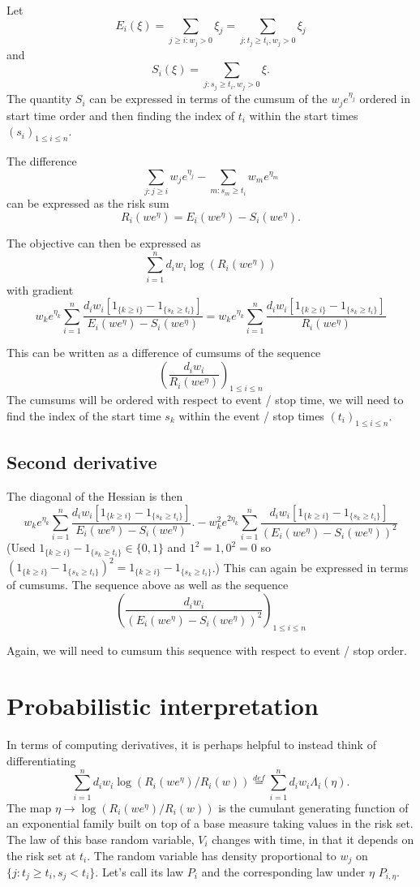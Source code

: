 \documentclass{article}
\begin{document}
Let 
$$
E_i(\xi) = \sum_{j \geq i: w_j > 0} \xi_j = \sum_{j: t_j \geq t_i, w_j > 0} \xi_j
$$
and
$$
S_i(\xi) = \sum_{j: s_j \geq t_i, w_j > 0} \xi.
$$
The quantity $S_i$ can be expressed in terms of the cumsum
of the $w_j e^{\eta_j}$ ordered in start time order and then finding the index
 of $t_i$ within the start times $(s_i)_{1 \leq i \leq n}$.
 
The difference
$$
\sum_{j: j \geq i} w_j e^{\eta_j} - \sum_{m:s_m \geq t_i} w_m e^{\eta_m}
$$
can be expressed as the risk sum
$$
R_i(we^{\eta}) = E_i(we^{\eta}) - S_i(we^{\eta}).$$


The objective can then be expressed as
$$
\sum_{i=1}^n d_i w_i \log(R_i(we^{\eta}))$$
with gradient
$$
w_k e^{\eta_k}
\sum_{i=1}^n 
\frac{d_i w_i [1_{\{k \geq i\}} - 1_{\{s_k \geq t_i\}}]}{E_i(we^{\eta})-S_i(we^{\eta})} = w_k e^{\eta_k}
\sum_{i=1}^n 
\frac{d_i w_i [1_{\{k \geq i\}} - 1_{\{s_k \geq t_i\}}]}{R_i(we^{\eta})}
$$

This can be written as a difference of cumsums of the sequence
$$
\left(\frac{d_i w_i}{R_i(we^{\eta})}\right)_{1 \leq i \leq n}
$$
The cumsums will be ordered with respect to event / stop time, we will need to find the index of the start time $s_k$ within the event / stop times $(t_i)_{1 \leq i \leq n}$.

\subsection{Second derivative}

The diagonal of the Hessian is then
$$
w_k e^{\eta_k}
\sum_{i=1}^n 
\frac{d_i w_i [1_{\{k \geq i\}} - 1_{\{s_k \geq t_i\}}]}{E_i(we^{\eta})-S_i(we^{\eta})}.
- w_k^2 e^{2 \eta_k} \sum_{i=1}^n \frac{d_i w_i [1_{\{k \geq i\}} - 1_{\{s_k \geq t_i\}}]}{(E_i(we^{\eta})-S_i(we^{\eta}))^2}
$$
(Used $1_{\{k \geq i\}}-1_{\{s_k \geq t_i\}} \in \{0,1\}$ and $1^2=1, 0^2=0$ so $(1_{\{k \geq i\}}-1_{\{s_k \geq t_i\}})^2=1_{\{k \geq i\}}-1_{\{s_k \geq t_i\}}$.)
This can again be expressed in terms of cumsums. The sequence above
as well as the sequence
$$
\left(\frac{d_i w_i}{(E_i(we^{\eta})-S_i(we^{\eta}))^2}\right)_{1 \leq i \leq n}
$$

Again, we will need to cumsum this sequence with respect to event / stop order.

\section{Probabilistic interpretation}

In terms of computing derivatives, it is 
perhaps helpful to instead  think of differentiating
$$
\sum_{i=1}^n d_i w_i \log(R_i(we^{\eta})/R_i(w))
\overset{def}{=} \sum_{i=1}^n d_i w_i \Lambda_i(\eta).
$$
The map $\eta \to \log(R_i(we^{\eta})/R_i(w))$ is the cumulant
generating function of an exponential family built on
top of a base measure taking values in the risk set. 
The law of this base random
variable, $V_i$ changes with time, in that it
depends on the risk set at $t_i$. The random variable
has density proportional to $w_j$ on $\{j:t_j \geq t_i, s_j < t_i\}.$ Let's call its law $P_i$ and the corresponding
law under $\eta$ $P_{i,\eta}$.
\end{document}
